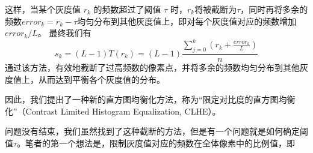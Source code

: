 \documentclass{ctexart}
\begin{document}
这样，当某个灰度值 $r_k$ 的频数超过了阈值 $\tau$ 时，$r_k$将被截断为$\tau$，同时再将多余的频数$error_k=r_k-\tau$均匀分布到其他灰度值上，即对每个灰度值对应的频数增加$error_k/L$。
最终我们有
\begin{equation}
s_k = (L-1)T(r_k)=(L-1)\frac{\sum_{j=0}^{k}(r_k+\frac{error_k}{L})}{n}
\end{equation}
通过该方法，有效地截断了过高频数的像素点，并将多余的频数均匀分布到其他灰度值上，从而达到平衡各个灰度值的分布。

因此，我们提出了一种新的直方图均衡化方法，称为“限定对比度的直方图均衡化”（Contrast Limited Histogram Equalization, CLHE）。

问题没有结束，我们虽然找到了这种截断的方法，但是有一个问题就是如何确定阈值$\tau$。笔者的第一个想法是，限制灰度值对应的频数在全体像素中的比例值，即
\end{document}
